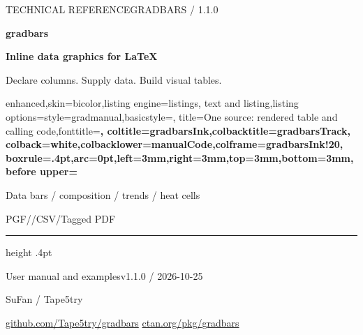 \begingroup
\setlength{\parindent}{0pt}
\setlength{\parskip}{4pt}
\thispagestyle{empty}
{\small\sffamily\color{gradbarsTeal}TECHNICAL REFERENCE\hfill GRADBARS / 1.1.0}\par
\vspace{8mm}
{\fontsize{50}{54}\selectfont\sffamily\bfseries\color{gradbarsInk}gradbars}\par
\vspace{3mm}
{\Large\bfseries\color{gradbarsInk}Inline data graphics for \LaTeX}\par
\vspace{3mm}
{\large\color{black!55}Declare columns. Supply data. Build visual tables.}\par
\vspace{7mm}
\begin{tcblisting}{enhanced,skin=bicolor,listing engine=listings,
  text and listing,listing options={style=gradmanual,basicstyle=\gradbarscodefont\fontsize{8}{10}\selectfont},
  title={One source: rendered table and calling code},fonttitle=\small\bfseries,
  coltitle=gradbarsInk,colbacktitle=gradbarsTrack,
  colback=white,colbacklower=manualCode,colframe=gradbarsInk!20,
  boxrule=.4pt,arc=0pt,left=3mm,right=3mm,top=3mm,bottom=3mm,
  before upper={\small\setlength{\parindent}{0pt}}}
\begin{center}
\begin{gradtable}[align=c,header align=c,width=\linewidth,column sep=4pt,row stretch=1.5,label width=7mm]
\end{gradtable}
\end{center}
\end{tcblisting}
\vspace{3mm}
{\small\sffamily\color{gradbarsTeal}Data bars / composition / trends / heat cells}\par
{\small\color{black!55}PGF/\manualTikZ{}\quad /\quad CSV\quad /\quad Tagged PDF}\par
\vfill
{\color{gradbarsInk!20}\hrule height .4pt}
\vspace{4mm}
{\small\sffamily\color{gradbarsInk}User manual and examples\hfill v1.1.0 / 2026-10-25}\par
{\small\sffamily SuFan / Tape5try}\par
{\footnotesize\href{https://github.com/Tape5try/gradbars}{github.com/Tape5try/gradbars}
\hfill\href{https://ctan.org/pkg/gradbars}{ctan.org/pkg/gradbars}}\par
\endgroup
